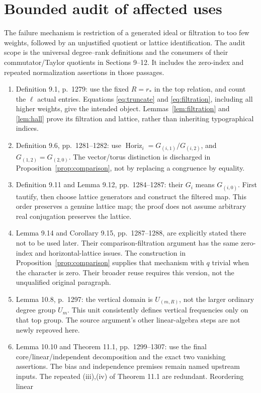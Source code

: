 \documentclass[11pt]{article}
\newcommand{\HH}{\operatorname{Horiz}}\newcommand{\poly}{\operatorname{poly}}
\begin{document}
\section{Bounded audit of affected uses}
The failure mechanism is restriction of a generated ideal or filtration to
too few weights, followed by an unjustified quotient or lattice identification.
The audit scope is the universal degree--rank definitions and the consumers
of their commutator/Taylor quotients in Sections 9--12. It includes the
zero-index and repeated normalization assertions in those passages.
\begin{enumerate}
\item Definition 9.1, p.~1279: use the fixed $R=r_*$ in the top relation,
and count the $\ell$ actual entries. Equations \eqref{eq:truncate} and
\eqref{eq:filtration}, including all higher weights, give the intended
object. Lemmas~\ref{lem:filtration} and \ref{lem:hall} prove its filtration
and lattice, rather than inheriting typographical indices.
\item Definition 9.6, pp.~1281--1282: use
$\HH_i=G_{(i,1)}/G_{(i,2)}$, and $G_{(1,2)}=G_{(2,0)}$.
The vector/torus distinction is discharged in
Proposition~\ref{prop:comparison}, not by replacing a congruence by equality.
\item Definition 9.11 and Lemma 9.12, pp.~1284--1287: their $G_i$ means
$G_{(i,0)}$. First tautify, then choose lattice generators and construct
the filtered map. This order preserves a genuine lattice map; the proof
does not assume arbitrary real conjugation preserves the lattice.
\item Lemma 9.14 and Corollary 9.15, pp.~1287--1288, are explicitly stated
there not to be used later. Their comparison-filtration argument has the
same zero-index and horizontal-lattice issues. The construction in
Proposition~\ref{prop:comparison} supplies that mechanism with $q$ trivial
when the character is zero. Their broader reuse requires this version,
not the unqualified original paragraph.
\item Lemma 10.8, p.~1297: the vertical domain is
$U_{(m,R)}$, not the larger ordinary degree group $U_m$.
This unit consistently defines vertical frequencies only on that top group.
The source argument's other linear-algebra steps are not newly reproved here.
\item Lemma 10.10 and Theorem 11.1, pp.~1299--1307: use the final
core/linear/independent decomposition and the exact two vanishing assertions.
The bias and independence premises remain named upstream inputs.
The repeated (iii),(iv) of Theorem 11.1 are redundant. Reordering linear

\end{enumerate}
\end{document}
